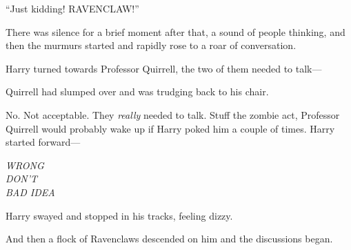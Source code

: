 ``Just kidding! RAVENCLAW!''

There was silence for a brief moment after that, a sound of people
thinking, and then the murmurs started and rapidly rose to a roar of
conversation.

Harry turned towards Professor Quirrell, the two of them needed to
talk---

Quirrell had slumped over and was trudging back to his chair.

No. Not acceptable. They \emph{really} needed to talk. Stuff the zombie
act, Professor Quirrell would probably wake up if Harry poked him a
couple of times. Harry started forward---

\emph{WRONG}\\\emph{DON'T}\\\emph{BAD IDEA}

Harry swayed and stopped in his tracks, feeling dizzy.

And then a flock of Ravenclaws descended on him and the discussions
began.
